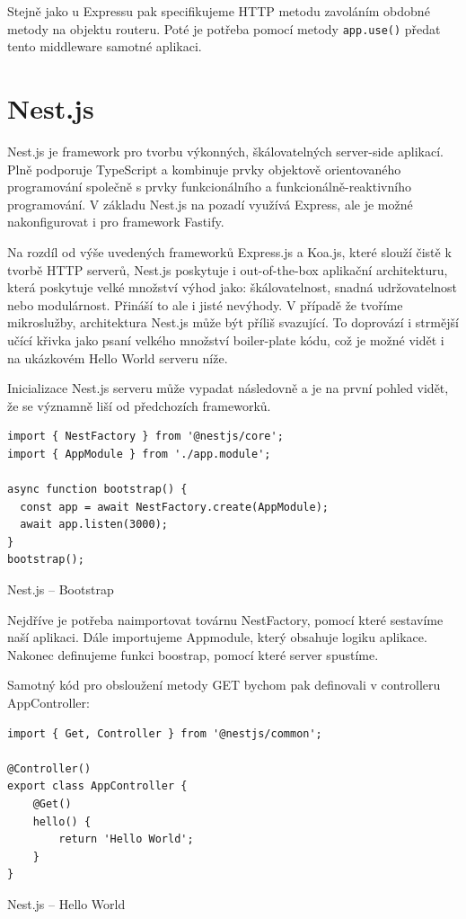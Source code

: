 \documentclass[thesis=M,czech]{FITthesis}[2019/12/23]
\begin{document}
Stejně jako u Expressu pak specifikujeme HTTP metodu zavoláním obdobné metody na objektu routeru. Poté je potřeba pomocí metody \texttt{app.use()} předat tento middleware samotné aplikaci.

\section{Nest.js}
Nest.js je framework pro tvorbu výkonných, škálovatelných server-side aplikací. Plně podporuje TypeScript a kombinuje prvky objektově orientovaného programování společně s prvky funkcionálního a funkcionálně-reaktivního programování. V základu Nest.js na pozadí využívá Express, ale je možné nakonfigurovat i pro framework Fastify.

Na rozdíl od  výše uvedených frameworků Express.js a Koa.js, které slouží čistě k tvorbě HTTP serverů, Nest.js poskytuje i out-of-the-box aplikační architekturu, která poskytuje velké množství výhod jako: škálovatelnost, snadná udržovatelnost nebo modulárnost. Přináší to ale i jisté nevýhody. V případě že tvoříme mikroslužby, architektura Nest.js může být příliš svazující. To doprovází i strmější učící křivka jako psaní velkého množství boiler-plate kódu, což je možné vidět i na ukázkovém Hello World serveru níže. 

Inicializace Nest.js serveru může vypadat následovně a je na první pohled vidět, že se významně liší od předchozích frameworků.

\begin{listing}[H]
\begin{verbatim}
import { NestFactory } from '@nestjs/core';
import { AppModule } from './app.module';

async function bootstrap() {
  const app = await NestFactory.create(AppModule);
  await app.listen(3000);
}
bootstrap();
\end{verbatim}
\caption{Nest.js -- Bootstrap}
\label{lst:nest_bootstrap}
\end{listing}

Nejdříve je potřeba naimportovat továrnu NestFactory, pomocí které sestavíme naší aplikaci. Dále importujeme Appmodule, který obsahuje logiku aplikace. Nakonec definujeme funkci boostrap, pomocí které server spustíme.

Samotný kód pro obsloužení metody GET bychom pak definovali v controlleru AppController:

\begin{listing}[H]
\begin{verbatim}
import { Get, Controller } from '@nestjs/common';

@Controller()
export class AppController {
    @Get()
    hello() {
        return 'Hello World';
    }
}
\end{verbatim}
\caption{Nest.js -- Hello World}
\label{lst:nest_hello}
\end{listing}
\end{document}
